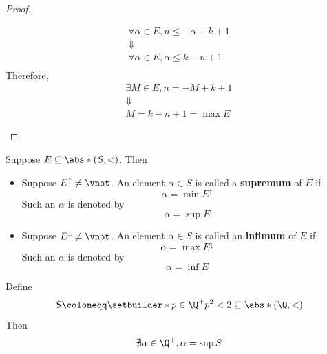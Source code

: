 \begin{proof}
\begin{enumerate}[label=\textbf{(\Alph*)}]
\[\begin{array}{c}
              \forall \alpha \in E, n \leq - \alpha + k + 1        \\
              \Downarrow                                           \\
              \forall \alpha \in E, \alpha \leq k - n + 1          \\
            \end{array}
          \]
          Therefore,
          \[
            \begin{array}{c}
              \exists M \in E, n = - M + k + 1 \\
              \Downarrow                       \\
              M = k - n + 1 = \max E
            \end{array}
          \]
  \end{enumerate}
\end{proof}

\bigskip

\begin{definition} \label{an:def:supremum-infimum}
  Suppose $E \subseteq \abs*{(S, <)}$. Then
  \begin{itemize}
    \item Suppose $E^{\uparrow} \neq \vnot$. An element $\alpha \in S$ is called a \textbf{supremum} of $E$ if
          \[
            \alpha = \min E^{\uparrow}
          \]
          Such an $\alpha$ is denoted by
          \[
            \alpha = \sup E
          \]
    \item Suppose $E^{\downarrow} \neq \vnot$. An element $\alpha \in S$ is called an \textbf{infimum} of $E$ if
          \[
            \alpha = \max E^{\downarrow}
          \]
          Such an $\alpha$ is denoted by
          \[
            \alpha = \inf E
          \]
  \end{itemize}
\end{definition}

\bigskip

\begin{theorem} \label{an:thm:Q-is-not-complete}
  Define
  \[
    S \coloneqq \setbuilder*{p \in \Q^{+}}{p^{2} < 2} \subseteq \abs*{(\Q, <)}
  \]
  Then
  \[
    \nexists \alpha \in \Q^{+}, \alpha = \sup S
  \]
\end{theorem}

